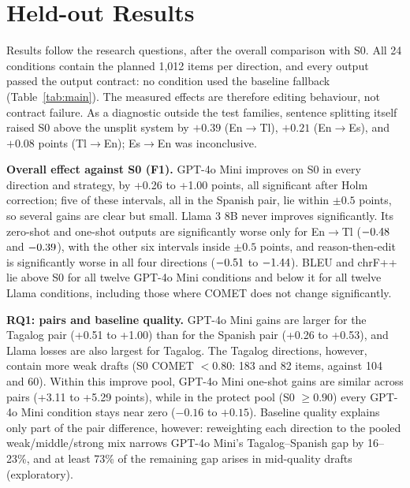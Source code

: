 \section{Held-out Results}
Results follow the research questions, after the overall comparison with S0. All 24 conditions contain the planned 1{,}012 items per direction, and every output passed the output contract: no condition used the baseline fallback (Table~\ref{tab:main}). The measured effects are therefore editing behaviour, not contract failure. As a diagnostic outside the test families, sentence splitting itself raised S0 above the unsplit system by $+0.39$ (En$\to$Tl), $+0.21$ (En$\to$Es), and $+0.08$ points (Tl$\to$En); Es$\to$En was inconclusive.

\textbf{Overall effect against S0 (F1).} GPT-4o Mini improves on S0 in every direction and strategy, by +0.26 to +1.00 points, all significant after Holm correction; five of these intervals, all in the Spanish pair, lie within $\pm0.5$ points, so several gains are clear but small. Llama 3 8B never improves significantly. Its zero-shot and one-shot outputs are significantly worse only for En$\to$Tl ($-0.48$ and $-0.39$), with the other six intervals inside $\pm0.5$ points, and reason-then-edit is significantly worse in all four directions ($-0.51$ to $-1.44$). BLEU and chrF++ lie above S0 for all twelve GPT-4o Mini conditions and below it for all twelve Llama conditions, including those where COMET does not change significantly.

\textbf{RQ1: pairs and baseline quality.} GPT-4o Mini gains are larger for the Tagalog pair (+0.51 to +1.00) than for the Spanish pair (+0.26 to +0.53), and Llama losses are also largest for Tagalog. The Tagalog directions, however, contain more weak drafts (S0 COMET $<0.80$: 183 and 82 items, against 104 and 60). Within this improve pool, GPT-4o Mini one-shot gains are similar across pairs (+3.11 to +5.29 points), while in the protect pool (S0 $\geq0.90$) every GPT-4o Mini condition stays near zero ($-0.16$ to $+0.15$). Baseline quality explains only part of the pair difference, however: reweighting each direction to the pooled weak/middle/strong mix narrows GPT-4o Mini's Tagalog--Spanish gap by 16--23\%, and at least 73\% of the remaining gap arises in mid-quality drafts (exploratory).

